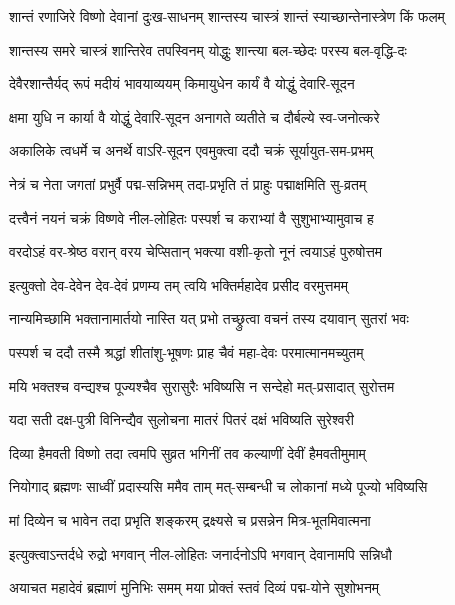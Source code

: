 \twolineshloka
{शान्तं रणाजिरे विष्णो देवानां दुःख-साधनम्}
{शान्तस्य चास्त्रं शान्तं स्याच्छान्तेनास्त्रेण किं फलम्}%

\twolineshloka
{शान्तस्य समरे चास्त्रं शान्तिरेव तपस्विनम्}
{योद्धुः शान्त्या बल-च्छेदः परस्य बल-वृद्धि-दः}%

\twolineshloka
{देवैरशान्तैर्यद् रूपं मदीयं भावयाव्ययम्}
{किमायुधेन कार्यं वै योद्धुं देवारि-सूदन}%

\twolineshloka
{क्षमा युधि न कार्या वै योद्धुं देवारि-सूदन}
{अनागते व्यतीते च दौर्बल्ये स्व-जनोत्करे}%

\twolineshloka
{अकालिके त्वधर्मे च अनर्थे वाऽरि-सूदन}
{एवमुक्त्वा ददौ चक्रं सूर्यायुत-सम-प्रभम्}%

\twolineshloka
{नेत्रं च नेता जगतां प्रभुर्वै पद्म-सन्निभम्}
{तदा-प्रभृति तं प्राहुः पद्माक्षमिति सु-व्रतम्}%

\twolineshloka
{दत्त्वैनं नयनं चक्रं विष्णवे नील-लोहितः}
{पस्पर्श च कराभ्यां वै सुशुभाभ्यामुवाच ह}%

\twolineshloka
{वरदोऽहं वर-श्रेष्ठ वरान् वरय चेप्सितान्}
{भक्त्या वशी-कृतो नूनं त्वयाऽहं पुरुषोत्तम}%

\twolineshloka
{इत्युक्तो देव-देवेन देव-देवं प्रणम्य तम्}
{त्वयि भक्तिर्महादेव प्रसीद वरमुत्तमम्}%

\twolineshloka
{नान्यमिच्छामि भक्तानामार्तयो नास्ति यत् प्रभो}
{तच्छ्रुत्वा वचनं तस्य दयावान् सुतरां भवः}%

\twolineshloka
{पस्पर्श च ददौ तस्मै श्रद्धां शीतांशु-भूषणः}
{प्राह चैवं महा-देवः परमात्मानमच्युतम्}%

\twolineshloka
{मयि भक्तश्च वन्द्यश्च पूज्यश्चैव सुरासुरैः}
{भविष्यसि न सन्देहो मत्-प्रसादात् सुरोत्तम}%

\twolineshloka
{यदा सती दक्ष-पुत्री विनिन्द्यैव सुलोचना}
{मातरं पितरं दक्षं भविष्यति सुरेश्वरी}%

\twolineshloka
{दिव्या हैमवती विष्णो तदा त्वमपि सुव्रत}
{भगिनीं तव कल्याणीं देवीं हैमवतीमुमाम्}%

\twolineshloka
{नियोगाद् ब्रह्मणः साध्वीं प्रदास्यसि ममैव ताम्}
{मत्-सम्बन्धी च लोकानां मध्ये पूज्यो भविष्यसि}%

\twolineshloka
{मां दिव्येन च भावेन तदा प्रभृति शङ्करम्}
{द्रक्ष्यसे च प्रसन्नेन मित्र-भूतमिवात्मना}%

\twolineshloka
{इत्युक्त्वाऽन्तर्दधे रुद्रो भगवान् नील-लोहितः}
{जनार्दनोऽपि भगवान् देवानामपि सन्निधौ}%

\twolineshloka
{अयाचत महादेवं ब्रह्माणं मुनिभिः समम्}
{मया प्रोक्तं स्तवं दिव्यं पद्म-योने सुशोभनम्}%

